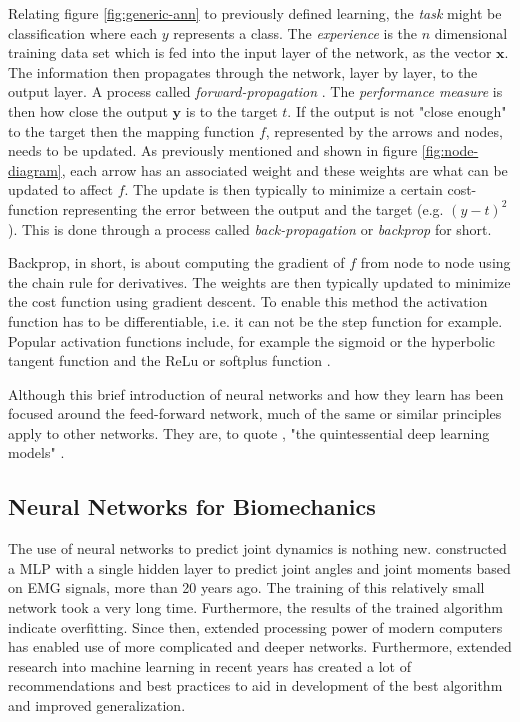Relating figure \ref{fig:generic-ann} to previously defined learning, the \textit{task} might be classification where each $y$ represents a class.
The \textit{experience} is the $n$ dimensional training data set which is fed into the input layer of the network, as the vector $\mathbf{x}$.
The information then propagates through the network, layer by layer, to the output layer. A process called \textit{forward-propagation} \cite{Goodfellow2016}.
The \textit{performance measure} is then how close the output $\mathbf{y}$ is to the target $t$.
If the output is not "close enough" to the target then the mapping function $f$, represented by the arrows and nodes, needs to be updated.
As previously mentioned and shown in figure \ref{fig:node-diagram}, each arrow has an associated weight and these weights are what can be updated to affect $f$.
The update is then typically to minimize a certain cost-function representing the error between the output and the target (e.g. $(y-t)^2$).
This is done through a process called \textit{back-propagation} or \textit{backprop} for short.

Backprop, in short, is about computing the gradient of $f$ from node to node using the chain rule for derivatives. 
The weights are then typically updated to minimize the cost function using gradient descent.
To enable this method the activation function has to be differentiable, i.e. it can not be the step function for example.
Popular activation functions include, for example the sigmoid or the hyperbolic tangent function and the ReLu or softplus function \cite{Goodfellow2016, Haykin2009, Rojas1996}.

Although this brief introduction of neural networks and how they learn has been focused around the feed-forward network, much of the same or similar principles apply to other networks. 
They are, to quote \citeauthor{Goodfellow2016}, "the quintessential deep learning models" \parencite[164]{Goodfellow2016}.




\subsection{Neural Networks for Biomechanics}
The use of neural networks to predict joint dynamics is nothing new.
\textcite{Sepulveda1993} constructed a \ac{MLP} with a single hidden layer to predict joint angles and joint moments based on EMG signals, more than 20 years ago. 
The training of this relatively small network took a very long time.
Furthermore, the results of the trained algorithm indicate overfitting.
Since then, extended processing power of modern computers has enabled use of more complicated and deeper networks.
Furthermore, extended research into machine learning in recent years has created a lot of recommendations and best practices to aid in development of the best algorithm and improved generalization.

